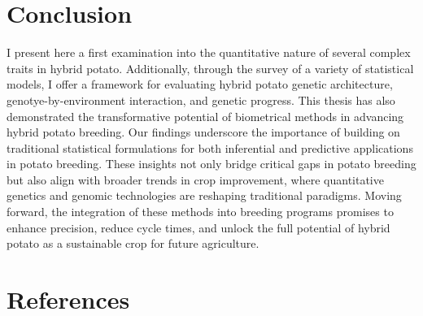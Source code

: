 \section{Conclusion}\label{conclusion}

I present here a first examination into the quantitative nature of
several complex traits in hybrid potato. Additionally, through the
survey of a variety of statistical models, I offer a framework for
evaluating hybrid potato genetic architecture, genotye-by-environment
interaction, and genetic progress. This thesis has also demonstrated the
transformative potential of biometrical methods in advancing hybrid
potato breeding. Our findings underscore the importance of building on
traditional statistical formulations for both inferential and predictive
applications in potato breeding. These insights not only bridge critical
gaps in potato breeding but also align with broader trends in crop
improvement, where quantitative genetics and genomic technologies are
reshaping traditional paradigms. Moving forward, the integration of
these methods into breeding programs promises to enhance precision,
reduce cycle times, and unlock the full potential of hybrid potato as a
sustainable crop for future agriculture.

\section*{References}\label{references}

